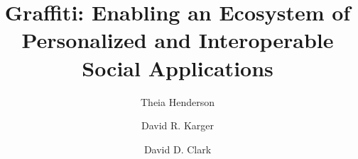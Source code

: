 \documentclass[sigconf]{acmart}
\title{Graffiti: Enabling an Ecosystem of Personalized and Interoperable Social Applications}
\author{Theia Henderson}
\affiliation{
  \institution{CSAIL, MIT}
  \city{Cambridge}
  \country{USA}
}
\author{David R. Karger}
\affiliation{
  \institution{CSAIL, MIT}
  \city{Cambridge}
  \country{USA}
}
\author{David D. Clark}
\affiliation{
  \institution{CSAIL, MIT}
  \city{Cambridge}
  \country{USA}
}
\begin{document}
\begin{abstract}

\end{abstract}
\maketitle












\clearpage
\appendix

\end{document}
